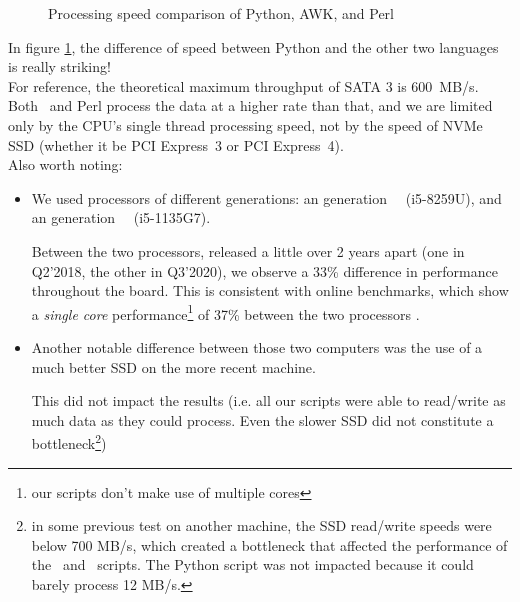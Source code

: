 \begin{figure}[h]
	\caption{Processing speed comparison of Python, AWK, and Perl}
	\medskip
	\pgfplotsset{compat=newest}
	\label{figure:throughput-comparison}
	
\end{figure}


\bigskip


In figure \ref{figure:throughput-comparison}, the difference of speed between Python and the other two languages is really striking! \\

For reference, the theoretical maximum throughput of SATA 3 is 600~MB/s. Both \awk\ and Perl process the data at a higher rate than that, and we are limited only by the CPU's single thread processing speed, not by the speed of NVMe SSD (whether it be PCI Express~3 or PCI Express~4). \\


Also worth noting:

\begin{itemize}
	
	\item We used processors of different generations: an  generation \Intel\ \Core\ (i5-8259U), and an  generation \Intel\ \Core\ (i5-1135G7).
	
	Between the two processors, released a little over 2 years apart (one in Q2'2018, the other in Q3'2020), we observe a 33\% difference in performance throughout the board.
	This is consistent with online benchmarks, which show a \emph{single core} performance\footnote{our scripts don't make use of multiple cores} of 37\% between the two processors \citep{userbenchmark}. \\
	
	\item Another notable difference between those two computers was the use of a much better SSD on the more recent machine.
	
	This did not impact the results (i.e. all our scripts were able to read/write as much data as they could process. Even the slower SSD did not constitute a bottleneck\footnote{in some previous test on another machine, the SSD read/write speeds were below 700 MB/s, which created a bottleneck that affected the performance of the \gawk\ and \perl\ scripts. The Python script was not impacted because it could barely process 12 MB/s.})
\end{itemize}

